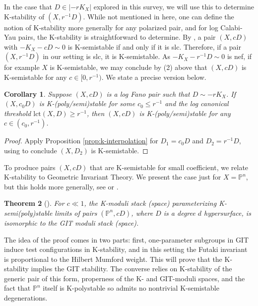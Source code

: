 \documentclass[11pt]{amsart}
\numberwithin{equation}{section}
\newtheorem{theorem}{Theorem}[section]
\newtheorem{cor}[theorem]{Corollary}
\theoremstyle{definition}
\newcommand{\bP}{\mathbb{P}}
\newcommand{\lct}{\mathrm{lct}}
\begin{document}
In the case that $D \in |-rK_X|$ explored in this survey, we will use this to determine K-stability of $(X,r^{-1}D)$.  While not mentioned in here, one can define the notion of K-stability more generally for any polarized pair, and for log Calabi-Yau pairs, the K-stability is straightforward to determine.  By \cite{Odaka13}, a pair $(X,cD)$ with $-K_X - cD \sim 0$ is K-semistable if and only if it is slc.  Therefore, if a pair $(X, r^{-1}D)$ in our setting is slc, it is K-semistable.  As $-K_X - r^{-1} D \sim 0$ is nef, if for example $X$ is K-semistable, we may conclude by (2) above that $(X, cD)$ is K-semistable for any $c \in [0, r^{-1})$.  We state a precise version below.

\begin{cor}
    Suppose $(X,cD)$ is a log Fano pair such that $D \sim -rK_X$. If $(X,c_0D)$ is K-(poly/semi)stable for some $c_0 \le r^{-1}$ and the log canonical threshold $\lct(X,D) \ge r^{-1}$, then $(X,cD)$ is K-(poly/semi)stable for any $c \in (c_0, r^{-1})$.  
\end{cor}

\begin{proof}
    Apply Proposition \ref{prop:k-interpolation} for $D_1 = c_0 D$ and $D_2 = r^{-1}D$, using \cite{Odaka13} to conclude $(X,D_2)$ is K-semistable.  
\end{proof}

To produce pairs $(X,cD)$ that are K-semistable for small coefficient, we relate K-stability to Geometric Invariant Theory. We present the case just for $X = \bP^n$, but this holds more generally, see \cite[Theorem 2.22]{ADLpub} or \cite[Theorem 1.11]{LZwalls}. 

\begin{theorem}[\cite{ADLpub}]\label{thm:k=git}
    For $c \ll 1$, the K-moduli stack (space) parameterizing K-semi(poly)stable limits of pairs $(\bP^n, cD)$, where $D$ is a degree $d$ hypersurface, is isomorphic to the GIT moduli stack (space).  
\end{theorem}

The idea of the proof comes in two parts: first, one-parameter subgroups in GIT induce test configurations in K-stability, and in this setting the Futaki invariant is proportional to the Hilbert Mumford weight.  This will prove that the K-stability implies the GIT stability.  The converse relies on K-stability of the generic pair of this form, properness of the K- and GIT-moduli spaces, and the fact that $\bP^n$ itself is K-polystable so admits no nontrivial K-semistable degenerations. 
\end{document}
